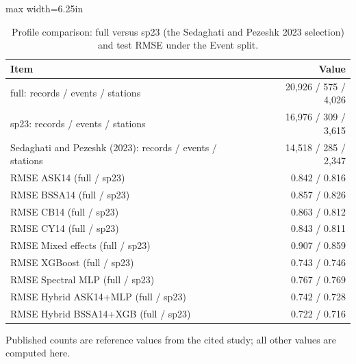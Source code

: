 \begin{table}[htbp]
\centering
\caption{Profile comparison: full versus sp23 (the Sedaghati and Pezeshk 2023 selection) and test RMSE under the Event split.}
\label{tab:tableS2_sp23_comparison}
\small
\begin{adjustbox}{max width=6.25in}
\begin{tabular}{lr}
\toprule
Item & Value \\
\midrule
full: records / events / stations & 20,926 / 575 / 4,026 \\
sp23: records / events / stations & 16,976 / 309 / 3,615 \\
Sedaghati and Pezeshk (2023): records / events / stations & 14,518 / 285 / 2,347 \\
RMSE ASK14 (full / sp23) & 0.842 / 0.816 \\
RMSE BSSA14 (full / sp23) & 0.857 / 0.826 \\
RMSE CB14 (full / sp23) & 0.863 / 0.812 \\
RMSE CY14 (full / sp23) & 0.843 / 0.811 \\
RMSE Mixed effects (full / sp23) & 0.907 / 0.859 \\
RMSE XGBoost (full / sp23) & 0.743 / 0.746 \\
RMSE Spectral MLP (full / sp23) & 0.767 / 0.769 \\
RMSE Hybrid ASK14+MLP (full / sp23) & 0.742 / 0.728 \\
RMSE Hybrid BSSA14+XGB (full / sp23) & 0.722 / 0.716 \\
\bottomrule
\end{tabular}
\end{adjustbox}
\par\smallskip
\parbox{6.25in}{\footnotesize Published counts are reference values from the cited study; all other values are computed here.}
\end{table}
